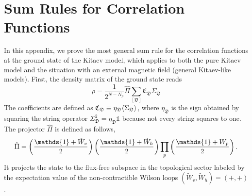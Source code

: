\section{Sum Rules for Correlation Functions}
In this appendix, we prove the most general sum rule for the correlation functions at the ground state of the Kitaev model, which applies to both the pure Kitaev model and the situation with an external magnetic field (general Kitaev-like models). First, the density matrix of the ground state reads
\begin{equation}\label{eq:pure-DM}
    \rho 
    = 
    \frac{1}{2^{N-N_p}}
    \hat{\Pi}
    \sum_{[\mathfrak{D}]}
    \mathfrak{C}_{\mathfrak{D}}
    \Sigma_{\mathfrak{D}}
\end{equation}
The coefficients are defined as $\mathfrak{C}_\mathfrak{D} \equiv \eta_\mathfrak{D}\langle \Sigma_\mathfrak{D} \rangle$, where $\eta_\mathfrak{D}$ is the sign obtained by squaring the string operator $\Sigma_\mathfrak{D}^2 = \eta_\mathfrak{D}\mathds{1}$ because not every string squares to one. The projector $\hat{\Pi}$ is defined as follows,
\[
\hat{\Pi}
=
\lr{\frac{\mathds{1} + \tilde{W}_v}{2}}
\lr{\frac{\mathds{1} + \tilde{W}_h}{2}}
\prod_{p}\lr{\frac{\mathds{1} + W_p}{2}}.
\]
It projects the state to the flux-free subspace in the topological sector labeled by the expectation value of the non-contractible Wilson loops $(\tilde{W}_v, \tilde{W}_h) = (+,+)$. 

